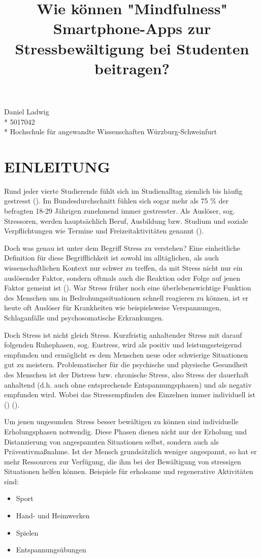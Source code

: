 \documentclass[10pt]{article}
\title{Wie können "Mindfulness" Smartphone-Apps zur Stressbewältigung bei Studenten beitragen? }
\makeatletter
\renewcommand{\maketitle}{\bgroup\setlength{\parindent}{0pt}
\begin{flushleft}
  \Large{\textbf{\@title}}
\end{flushleft}\egroup
}
\newcommand{\zit}[1]{(\cite{#1})}
\makeatother
\begin{document}
\maketitle

\begin{flushleft}
Daniel Ladwig  \\* 
5017042 \\* 
Hochschule für angewandte Wissenschaften Würzburg-Schweinfurt
\end{flushleft}

\section{EINLEITUNG}

Rund jeder vierte Studierende fühlt sich im Studienalltag ziemlich bis häufig gestresst \zit{gesundheitStudis2017}. Im Bundesdurchschnitt fühlen sich sogar mehr als 75 \% der befragten 18-29 Jährigen zunehmend immer gestresster. Als Auslöser, sog. Stressoren, werden hauptsächlich Beruf, Ausbildung bzw. Studium und soziale Verpflichtungen wie Termine und Freizeitaktivitäten genannt \zit{tkEntspannDich2016}. 

Doch was genau ist unter dem Begriff Stress zu verstehen? Eine einheitliche Definition für diese Begrifflichkeit ist sowohl im alltäglichen, als auch wissenschaftlichen Kontext nur schwer zu treffen, da mit Stress nicht nur ein auslösender Faktor, sondern oftmals auch die Reaktion oder Folge auf jenen Faktor gemeint ist \zit{StressAllgemein}. War Stress früher noch eine überlebenswichtige Funktion des Menschen um in Bedrohungssituationen schnell reagieren zu können, ist er heute oft Auslöser für Krankheiten wie beispielsweise Verspannungen, Schlaganfälle und psychosomatische Erkrankungen. 

Doch Stress ist nicht gleich Stress. Kurzfristig anhaltender Stress mit darauf folgenden Ruhephasen, sog. Eustress, wird als positiv und leistungssteigernd empfunden und ermöglicht es dem Menschen neue oder schwierige Situationen gut zu meistern. 
Problematischer für die psychische und physische Gesundheit des Menschen ist der Distress bzw. chronische Stress, also Stress der dauerhaft anhaltend (d.h. auch ohne entsprechende Entspannungsphasen) und als negativ empfunden wird. Wobei das Stressempfinden des Einzelnen immer individuell ist \zit{StressGrundwissen} \zit{ChronischerStress}. 

Um jenen \grqq ungesunden\grqq\  Stress besser bewältigen zu können sind individuelle Erholungsphasen notwendig. Diese Phasen dienen nicht nur der Erholung  und Distanzierung von angespannten Situationen selbst, sondern auch als Präventivmaßnahme. Ist der Mensch grundsätzlich weniger angespannt, so hat er mehr Ressourcen zur Verfügung, die ihm bei der Bewältigung von stressigen Situationen helfen können. 
Beispiele für erholsame und regenerative Aktivitäten sind:
\begin{itemize}[itemsep=0.5mm, parsep=0pt]
\item  Sport
\item  Hand- und Heimwerken
\item  Spielen
\item Entspannungsübungen
\end{itemize}
\end{document}
